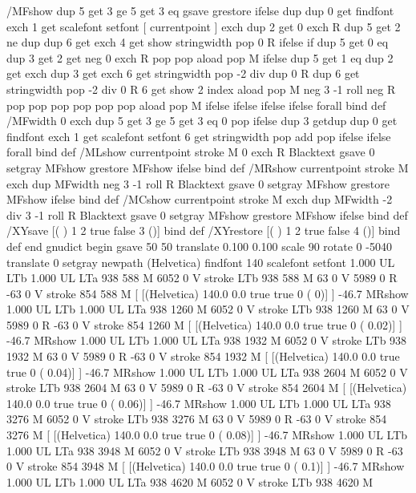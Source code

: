 /MFshow {
   { dup 5 get 3 ge
     { 5 get 3 eq {gsave} {grestore} ifelse }
     {dup dup 0 get findfont exch 1 get scalefont setfont
     [ currentpoint ] exch dup 2 get 0 exch R dup 5 get 2 ne {dup dup 6
     get exch 4 get {show} {stringwidth pop 0 R} ifelse }if dup 5 get 0 eq
     {dup 3 get {2 get neg 0 exch R pop} {pop aload pop M} ifelse} {dup 5
     get 1 eq {dup 2 get exch dup 3 get exch 6 get stringwidth pop -2 div
     dup 0 R} {dup 6 get stringwidth pop -2 div 0 R 6 get
     show 2 index {aload pop M neg 3 -1 roll neg R pop pop} {pop pop pop
     pop aload pop M} ifelse }ifelse }ifelse }
     ifelse }
   forall} bind def
/MFwidth {0 exch { dup 5 get 3 ge { 5 get 3 eq { 0 } { pop } ifelse }
 {dup 3 get{dup dup 0 get findfont exch 1 get scalefont setfont
     6 get stringwidth pop add} {pop} ifelse} ifelse} forall} bind def
/MLshow { currentpoint stroke M
  0 exch R
  Blacktext {gsave 0 setgray MFshow grestore} {MFshow} ifelse } bind def
/MRshow { currentpoint stroke M
  exch dup MFwidth neg 3 -1 roll R
  Blacktext {gsave 0 setgray MFshow grestore} {MFshow} ifelse } bind def
/MCshow { currentpoint stroke M
  exch dup MFwidth -2 div 3 -1 roll R
  Blacktext {gsave 0 setgray MFshow grestore} {MFshow} ifelse } bind def
/XYsave    { [( ) 1 2 true false 3 ()] } bind def
/XYrestore { [( ) 1 2 true false 4 ()] } bind def
end
gnudict begin
gsave
50 50 translate
0.100 0.100 scale
90 rotate
0 -5040 translate
0 setgray
newpath
(Helvetica) findfont 140 scalefont setfont
1.000 UL
LTb
1.000 UL
LTa
938 588 M
6052 0 V
stroke
LTb
938 588 M
63 0 V
5989 0 R
-63 0 V
stroke
854 588 M
[ [(Helvetica) 140.0 0.0 true true 0 ( 0)]
] -46.7 MRshow
1.000 UL
LTb
1.000 UL
LTa
938 1260 M
6052 0 V
stroke
LTb
938 1260 M
63 0 V
5989 0 R
-63 0 V
stroke
854 1260 M
[ [(Helvetica) 140.0 0.0 true true 0 ( 0.02)]
] -46.7 MRshow
1.000 UL
LTb
1.000 UL
LTa
938 1932 M
6052 0 V
stroke
LTb
938 1932 M
63 0 V
5989 0 R
-63 0 V
stroke
854 1932 M
[ [(Helvetica) 140.0 0.0 true true 0 ( 0.04)]
] -46.7 MRshow
1.000 UL
LTb
1.000 UL
LTa
938 2604 M
6052 0 V
stroke
LTb
938 2604 M
63 0 V
5989 0 R
-63 0 V
stroke
854 2604 M
[ [(Helvetica) 140.0 0.0 true true 0 ( 0.06)]
] -46.7 MRshow
1.000 UL
LTb
1.000 UL
LTa
938 3276 M
6052 0 V
stroke
LTb
938 3276 M
63 0 V
5989 0 R
-63 0 V
stroke
854 3276 M
[ [(Helvetica) 140.0 0.0 true true 0 ( 0.08)]
] -46.7 MRshow
1.000 UL
LTb
1.000 UL
LTa
938 3948 M
6052 0 V
stroke
LTb
938 3948 M
63 0 V
5989 0 R
-63 0 V
stroke
854 3948 M
[ [(Helvetica) 140.0 0.0 true true 0 ( 0.1)]
] -46.7 MRshow
1.000 UL
LTb
1.000 UL
LTa
938 4620 M
6052 0 V
stroke
LTb
938 4620 M
